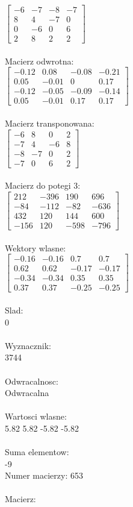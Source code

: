 \documentclass[a4paper,12pt]{article}
\begin{document}
$\begin{bmatrix} -6&-7&-8&-7\\8&4&-7&0\\0&-6&0&6\\2&8&2&2 \end{bmatrix}$
\\
\\
Macierz odwrotna:\\

$\begin{bmatrix} -0.12&0.08&-0.08&-0.21\\0.05&-0.01&0&0.17\\-0.12&-0.05&-0.09&-0.14\\0.05&-0.01&0.17&0.17 \end{bmatrix}$
\\
\\
Macierz transponowana:\\

$\begin{bmatrix} -6&8&0&2\\-7&4&-6&8\\-8&-7&0&2\\-7&0&6&2 \end{bmatrix}$
\\
\\
Macierz do potegi 3:\\

$\begin{bmatrix} 212&-396&190&696\\-84&-112&-82&-636\\432&120&144&600\\-156&120&-598&-796 \end{bmatrix}$
\\
\\
Wektory wlasne:\\

$\begin{bmatrix} -0.16&-0.16&0.7&0.7\\0.62&0.62&-0.17&-0.17\\-0.34&-0.34&0.35&0.35\\0.37&0.37&-0.25&-0.25 \end{bmatrix}$
\\
\\
Slad:\\
0
\\
\\
Wyznacznik:\\
3744
\\
\\
Odwracalnosc:\\
Odwracalna
\\
\\
Wartosci wlasne:\\
5.82 5.82 -5.82 -5.82
\\
\\
Suma elementow:\\
-9
\\
\newpage
Numer macierzy:
653
\\
\\
Macierz:\\
\end{document}
